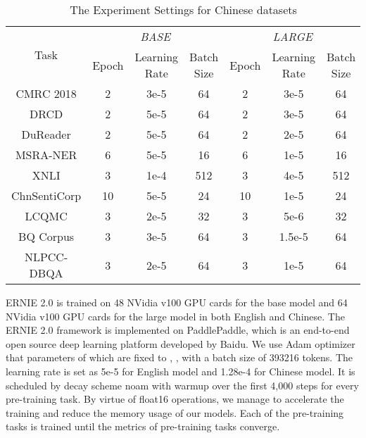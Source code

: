 \documentclass[letterpaper]{article} \usepackage{aaai20}  \usepackage{times}  \usepackage{helvet} \usepackage{courier}  \usepackage[hyphens]{url}  \usepackage{graphicx} \usepackage{makecell}
\begin{document}
\begin{table}[htbp]
\small
\begin{center}
\resizebox{0.45\textwidth}{!}
{
\begin{tabular}{@{}c|ccc|ccc@{}}
  \hline \hline
   \multirow{2}{*}{Task}      &  \multicolumn{3}{c|}{\textit{BASE}} & \multicolumn{3}{c}{\textit{LARGE}} \\ \cline{2-7}
                &  Epoch & \makecell{Learning \\ Rate} & \makecell{Batch \\ Size} &  Epoch & \makecell{Learning \\Rate}  & \makecell{Batch \\ Size} \\ \hline 
  CMRC 2018  & 2 & 3e-5 & 64 & 2 & 3e-5 & 64 \\
  DRCD  & 2 & 5e-5 & 64 & 2 & 3e-5 & 64 \\
  DuReader  & 2 & 5e-5 & 64 & 2 & 2e-5 & 64 \\
  MSRA-NER  & 6 & 5e-5 & 16    & 6 & 1e-5 & 16 \\
  XNLI  & 3 & 1e-4 &  512 & 3 & 4e-5 & 512  \\
  ChnSentiCorp  & 10 & 5e-5 & 24  & 10 & 1e-5 & 24  \\
  LCQMC  & 3 & 2e-5 & 32  & 3 & 5e-6 & 32  \\
  BQ Corpus  & 3 & 3e-5 & 64  & 3 & 1.5e-5 & 64  \\
  NLPCC-DBQA  & 3 & 2e-5 & 64 & 3 & 1e-5 & 64 \\
\hline \hline
\end{tabular}

} \end{center}
\caption{The Experiment Settings for Chinese datasets}
\label{chinese_finetune_setting}
\end{table}


ERNIE 2.0 is trained on 48 NVidia v100 GPU cards for the base model and 64 NVidia v100 GPU cards for the large model in both English and Chinese. The ERNIE 2.0 framework is implemented on PaddlePaddle, which is an end-to-end open source deep learning platform developed by Baidu. We use Adam optimizer that parameters of which are fixed to , , with a batch size of 393216 tokens. The learning rate is set as 5e-5 for English model and 1.28e-4 for Chinese model. It is scheduled by decay scheme noam \cite{vaswani2017attention} with warmup over the first 4,000 steps for every pre-training task. By virtue of float16 operations, we manage to accelerate the training and reduce the memory usage of our models. Each of the pre-training tasks is trained until the metrics of pre-training tasks converge. 
\end{document}
